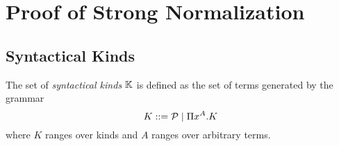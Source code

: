 \section{Proof of Strong Normalization}



\subsection{Syntactical Kinds}

\begin{definition}
    The set of \emph{syntactical kinds} $\mathbb{K}$ is defined as the set of terms
    generated by the grammar
    $$
    K ::= {\cal P} \;|\; \Pi x^A. K
    $$
    where $K$ ranges over kinds and $A$ ranges over arbitrary terms.
\end{definition}


